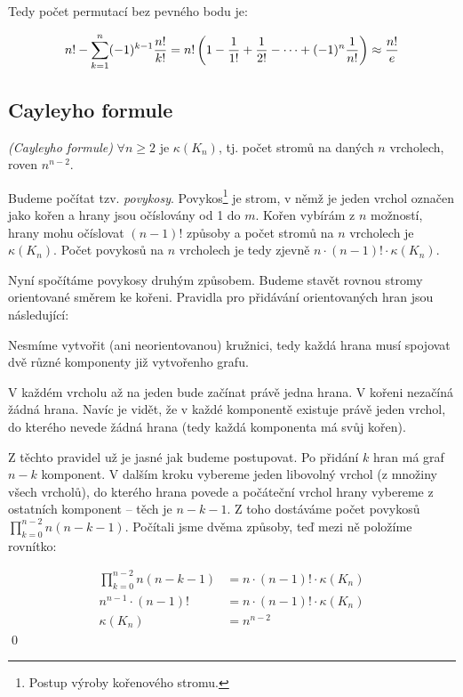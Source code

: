 Tedy počet permutací bez pevného bodu je:

$$n! - \sum_{k=1}^n (-1)^{k-1}{n!\over k!} = n!\left( 1-{1\over 1!}+{1\over
2!}-\cdots +(-1)^n{1\over n!} \right) \approx {n!\over e}$$


\subsection{Cayleyho formule}

\vt \emph{(Cayleyho formule)} $\forall n\ge 2$ je $\kappa(K_n)$, tj. počet
stromů na daných $n$ vrcholech, roven $n^{n-2}$.

\dk Budeme počítat tzv. \emph{povykosy}. Povykos\footnote{Postup výroby kořenového
stromu.} je strom, v němž je jeden vrchol označen jako kořen a hrany jsou
očíslovány od 1 do $m$. Kořen vybírám z $n$ možností, hrany mohu očíslovat
$(n-1)!$ způsoby a počet stromů na $n$ vrcholech je $\kappa(K_n)$. Počet
povykosů na $n$ vrcholech je tedy zjevně $n\cdot(n-1)!\cdot\kappa(K_n)$.

Nyní spočítáme povykosy druhým způsobem. Budeme stavět rovnou stromy orientované
směrem ke kořeni. Pravidla pro přidávání orientovaných hran jsou následující:
\begin{enumerate*}
\item Nesmíme vytvořit (ani neorientovanou) kružnici, tedy každá hrana musí
spojovat dvě různé komponenty již vytvořenho grafu.
\item V každém vrcholu až na jeden bude začínat právě jedna hrana. V kořeni
nezačíná žádná hrana. Navíc je vidět, že v každé komponentě existuje právě jeden
vrchol, do kterého nevede žádná hrana (tedy každá komponenta má svůj kořen).
\end{enumerate*}
Z těchto pravidel už je jasné jak budeme postupovat. Po přidání $k$ hran má graf
$n-k$ komponent. V dalším kroku vybereme jeden libovolný vrchol (z množiny všech
vrcholů), do kterého hrana povede a počáteční vrchol hrany vybereme z ostatních
komponent -- těch je $n-k-1$. Z toho dostáváme počet povykosů $\prod_{k=0}^{n-2}
n(n-k-1)$. Počítali jsme dvěma způsoby, teď mezi ně položíme rovnítko:

\begin{align*}
\prod_{k=0}^{n-2} n(n-k-1) &= n\cdot(n-1)!\cdot\kappa(K_n) \\
n^{n-1}\cdot (n-1)! &= n\cdot(n-1)!\cdot\kappa(K_n) \\
\kappa(K_n) &= n^{n-2}
\end{align*}
\qed

